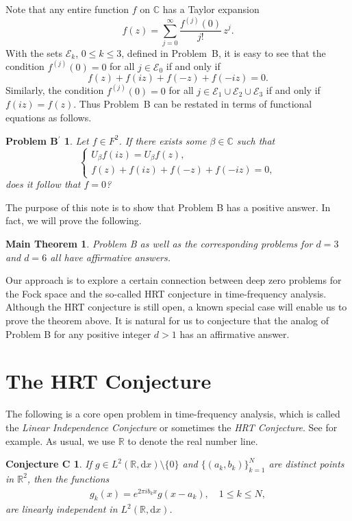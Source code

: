 \documentclass[reqno,11pt]{amsart}
\newtheorem*{mthm*}{Main Theorem}
\newtheorem*{problembstar*}{Problem B$^\prime$}
\newtheorem*{conjecturec*}{Conjecture C}
\newcommand{\C}{\mathbb C}
\newcommand{\E}{\mathcal E}
\newcommand{\R}{\mathbb R}
\begin{document}
Note that any entire function $f$ on $\C$ has a Taylor expansion
$$f(z)=\sum_{j=0}^\infty\frac{f^{(j)}(0)}{j!}\,z^j.$$
With the sets $\E_k$, $0\le k\le 3$, defined in Problem~B, it is easy 
to see that the condition $f^{(j)}(0)=0$ for all $j\in\E_0$ if and only if
$$f(z)+f(iz)+f(-z)+f(-iz)=0.$$
Similarly, the condition $f^{(j)}(0)=0$ for all $j\in\E_1\cup\E_2\cup\E_3$
if and only if $f(iz)=f(z)$. Thus Problem~B can be restated in terms of
functional equations as follows.

\begin{problembstar*}
Let $f\in F^2$. If there exists some $\beta\in\C$ such that
$$\begin{cases}
U_\beta f(iz)=U_\beta f(z),\\
f(z)+f(iz)+f(-z)+f(-iz)=0,
\end{cases}$$
does it follow that $f=0$?
\end{problembstar*}

The purpose of this note is to show that Problem B has a positive answer. 
In fact, we will prove the following.

\begin{mthm*}
Problem B as well as the corresponding problems for $d=3$ and $d=6$ 
all have affirmative answers.
\end{mthm*}

Our approach is to explore a certain connection between deep zero problems 
for the Fock space and the so-called HRT conjecture in time-frequency analysis. 
Although the HRT conjecture is still open, a known special case will enable us 
to prove the theorem above. It is natural for us to conjecture that the analog
of Problem B for any positive integer $d>1$ has an affirmative answer.




\section{The HRT Conjecture}\label{s2}

The following is a core open problem in time-frequency analysis, which 
is called the {\it Linear Independence Conjecture} or sometimes the 
{\it HRT Conjecture}. See \cite{Heil2007,HRT1996} for example. As usual,
we use $\R$ to denote the real number line.

\begin{conjecturec*}
If $g\in L^2(\R, \mathrm{d}x)\setminus\{0\}$ and $\{(a_k, b_k)\}_{k=1}^N$ 
are distinct points in $\R^2$, then the functions
\begin{align*}  
g_k(x)=e^{2\pi i b_kx}g(x-a_k),\quad 1\le k\le N,
\end{align*}
are linearly independent in $L^2(\R, \mathrm{d}x)$.
\end{conjecturec*}
\end{document}
